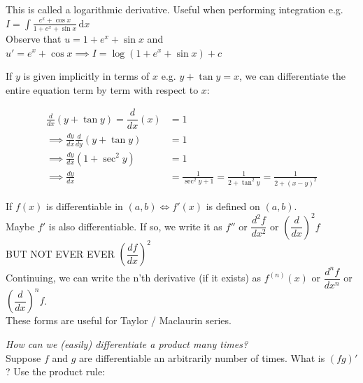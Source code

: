 This is called a logarithmic derivative. Useful when performing integration e.g.\\

$\displaystyle{
I = \int \frac{e^x + \cos x}{1 + e^x + \sin x} \, \mathrm{d}x
}$\\

Observe that $u = 1 + e^x + \sin x$ and $u' = e^x + \cos x \implies I = \log(1 + e^x + \sin x) + c$

\pagebreak


If $y$ is given implicitly in terms of $x$ e.g. $y + \tan y = x$, we can differentiate the entire equation term by term with respect to $x$:

\[\begin{flalign}\nonumber
\frac{d}{dx}(y + \tan y) = \dfrac{d}{dx}(x) &= 1
\\ \nonumber 
\implies \frac{dy}{dx}\frac{d}{dy}(y + \tan y) &= 1
\\ \nonumber
\implies \frac{dy}{dx}(1 + \sec^2y) &= 1
\\ \nonumber
\implies \frac{dy}{dx} &= \frac{1}{\sec^2y + 1} = \frac{1}{2 + \tan^2y} = \frac{1}{2 + (x-y)^2}
\end{flalign}
\]


If $f(x)$ is differentiable in $(a,b) \iff f'(x)$ is defined on $(a,b)$.\\

 Maybe $f'$ is also differentiable. If so, we write it as $f''$ or $\dfrac{d^2f}{dx^2}$ or $\left(\dfrac{d}{dx}\right)^2f$\\
 
 BUT NOT EVER EVER $\left(\dfrac{df}{dx}\right)^2$\\
 
 Continuing, we can write the n'th derivative (if it exists) as $f^{(n)}(x)$ or  $\dfrac{d^nf}{dx^n} $ or $\left(\dfrac{d}{dx}\right)^n f$.\\
 These forms are useful for Taylor / Maclaurin series.


\textit{How can we (easily) differentiate a product many times?}\\

Suppose $f$ and $g$ are differentiable an arbitrarily number of times. What is $(fg)'$? Use the product rule:\\

